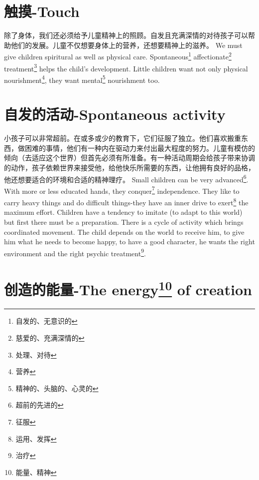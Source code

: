 \documentclass[lang=cn,10pt]{elegantbook}
\begin{document}
\chapter{触摸-Touch}

\begin{tcolorbox}[title=摘要,
colback=red!5!white,
colframe=red!75!black,
fonttitle=\bfseries]
除了身体，我们还必须给予儿童精神上的照顾。自发且充满深情的对待孩子可以帮助他们的发展。儿童不仅想要身体上的营养，还想要精神上的滋养。
We must give children spiritural as well as physical care. Spontaneous\footnote{自发的、无意识的} affectionate\footnote{慈爱的、充满深情的} treatment\footnote{处理、对待} helps the child's development. Little children want not only physical nourishment\footnote{营养}, they want mental\footnote{精神的、头脑的、心灵的} nourishment too.
\end{tcolorbox}

\chapter{自发的活动-Spontaneous activity}

\begin{tcolorbox}[title=摘要,
colback=red!5!white,
colframe=red!75!black,
fonttitle=\bfseries]
小孩子可以非常超前。在或多或少的教育下，它们征服了独立。他们喜欢搬重东西，做困难的事情，他们有一种内在驱动力来付出最大程度的努力。儿童有模仿的倾向（去适应这个世界）但首先必须有所准备。有一种活动周期会给孩子带来协调的动作，孩子依赖世界来接受他，给他快乐所需要的东西，让他拥有良好的品格，他还想要适合的环境和合适的精神理疗。
Small children can be very advanced\footnote{超前的先进的}. With more or less educated hands, they conquer\footnote{征服} independence. They like to carry heavy things and do difficult things-they have an inner drive to exert\footnote{运用、发挥} the maximum effort. Children have a tendency to imitate (to adapt to this world) but first there must be a preparation. There is a cycle of activity which brings coordinated movement. The child depends on the world to receive him, to give him what he needs to become happy, to have a good character, he wants the right environment and the right psychic treatment\footnote{治疗}.
\end{tcolorbox}

\chapter{创造的能量-The energy\footnote{能量、精神} of creation}
\end{document}
